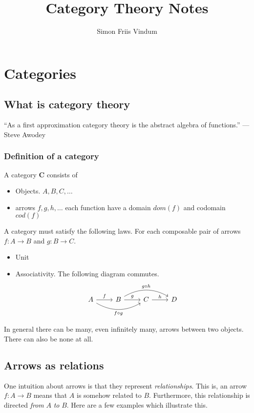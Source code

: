 \documentclass{book}
\title{Category Theory Notes}
\author{Simon Friis Vindum}
\theoremstyle{definition}
\begin{document}
\maketitle

\tableofcontents
\newpage

\chapter{Categories}

\section{What is category theory}

``As a first approximation category theory is the abstract algebra of
functions.'' --- Steve Awodey

\subsection{Definition of a category}

A category $\mathbf{C}$ consists of
\begin{itemize}
\item Objects. $A, B, C, \dots$
  \item arrows $f, g, h, \dots$ each function have a domain $dom(f)$ and
    codomain $cod(f)$
\end{itemize}

A category must satisfy the following laws. For each composable pair of arrows
$f : A \to B$ and $g : B \to C$.
\begin{itemize}
  \item Unit
  \item Associativity.
    The following diagram commutes.
    \[
      \begin{tikzcd}
        A \ar[rr, bend right, "f \circ g"'] \ar[r, "f"] & \ar[rr, bend left, "g \circ h"] B \ar[r, "g"] & C \ar[r, "h"] & D
      \end{tikzcd}
    \]
\end{itemize}

In general there can be many, even infinitely many, arrows between two objects.
There can also be none at all.

\section{Arrows as relations}

One intuition about arrows is that they represent \textit{relationships}.
This is, an arrow $f : A \to B$ means that $A$ is somehow related to $B$.
Furthermore, this relationship is directed \textit{from} $A$ \emph{to} $B$.
Here are a few examples which illustrate this.
\end{document}
